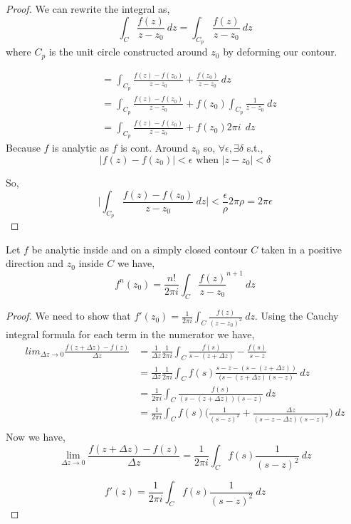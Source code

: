 \begin{proof}
   We can rewrite the integral as, 
   $$\int_C \frac{f(z)}{z - z_0}\:dz = \int_{C_p} \frac{f(z)}{z - z_0}\:dz$$ where $C_p$ is the unit circle constructed around $z_0$ by deforming our contour.

   \begin{align*}
   &=\int_{C_p} \frac{f(z) - f(z_0)}{z - z_0} + \frac{f(z_0)}{z - z_0}\:dz\\
   &=\int_{C_p} \frac{f(z) - f(z_0)}{z - z_0} + f(z_0) \int_{C_p}\frac{1}{z - z_0}\:dz\\
   &=\int_{C_p} \frac{f(z) - f(z_0)}{z - z_0} + f(z_0)2\pi i \: \:dz
   \end{align*}
   Because $f$ is analytic as $f$ is cont. Around $z_0$ so, $\forall \epsilon, \exists \delta$ s.t.,  
   $$ |f (z) - f(z_0)| < \epsilon \text{ when } |z - z_0| < \delta $$ 

   So, 
   $$ \bigg | \int_{C_p} \frac{f(z) - f(z_0)}{z - z_0} \:dz \bigg| < \frac{\epsilon}{\rho} 2 \pi \rho = 2\pi \epsilon$$ 

\end{proof}


\begin{theorem}
   Let $f$ be analytic inside and on a simply closed contour $C$ taken in a positive direction and $z_0$ inside $C$ we have, 
   $$ f^{n} (z_0) = \frac{n!}{2\pi i}\int_C \frac{f(z)}{z - z_0}^{n+1}\:dz $$ 
\end{theorem}

\begin{proof}
We need to show that $f'(z_0) = \frac{1}{2\pi i} \int_C \frac{f(z)}{(z - z_0)^2} \: dz$. Using the Cauchy integral formula for each term in the numerator we have, 
\begin{align*}
   lim_{\Delta z \rightarrow 0} \frac{f(z + \Delta z) - f(z)}{\Delta z}  &= \frac{1}{\Delta z} \frac{1}{2 \pi i} \int_C \frac{f(s)}{s - (z + \Delta z)} - \frac{f(s)}{s - z}\\
    &=\frac{1}{\Delta z} \frac{1}{2 \pi i} \int_C f(s) \frac{s - z - (s - (z + \Delta z))}{(s - (z + \Delta z)(s - z)} \: dz\\
    &=\frac{1}{2\pi i}\int_C \frac{f(s)}{(s - (z + \Delta z))(s - z)} \: dz\\
    &=\frac{1}{2\pi i} \int_C f(s) \bigg ( \frac{1}{(s-z)^2} + \frac{\Delta z}{(s - z - \Delta z)(s-z)^2} \bigg ) \: dz\\
\end{align*}
Now we have, 
$$ \lim_{\Delta z \to 0} \frac{f(z + \Delta z) - f(z)}{\Delta z} = \frac{1}{2 \pi i}\int_C f(s) \frac{1}{(s-z)^2} \: dz $$ 

$$ f'(z)= \frac{1}{2 \pi i}\int_C f(s) \frac{1}{(s-z)^2} \: dz $$ 
\end{proof}

